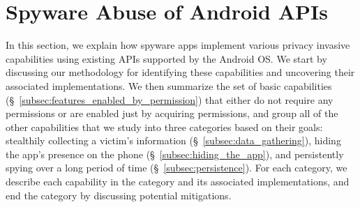 \section{Spyware Abuse of Android APIs}
\label{sec:api-abuse}

In this section, we explain how spyware apps implement various privacy invasive
capabilities using existing APIs supported by the Android OS.
We start by discussing our methodology for identifying these capabilities and uncovering their associated implementations.
We then summarize the set of basic capabilities (\S~\ref{subsec:features_enabled_by_permission}) that either do not require any permissions or are enabled just by acquiring permissions,
and group
all of the other capabilities that we study into three categories based on their goals: stealthily
collecting a victim's information (\S~\ref{subsec:data_gathering}), hiding the app's presence on the phone (\S~\ref{subsec:hiding_the_app}), and persistently
spying over a long period of time (\S~\ref{subsec:persistence}).
For each category, we
describe
each capability in the category and its associated implementations, and end
the category by discussing potential mitigations.


